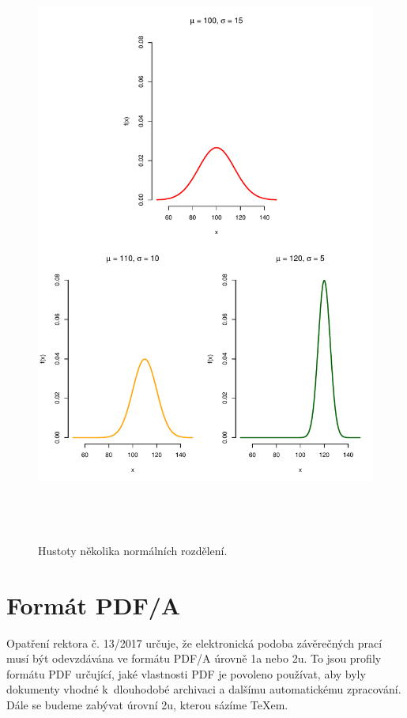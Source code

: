 \begin{figure}[p]\centering
\includegraphics[width=140mm, height=198mm]{../img/ukazka-obr03}
\caption{Hustoty několika normálních rozdělení.}
\label{obr03:Nhust:podruhe}

\end{figure}

\chapter{Formát PDF/A}

Opatření rektora č. 13/2017 určuje, že elektronická podoba závěrečných
prací musí být odevzdávána ve formátu PDF/A úrovně 1a nebo 2u. To jsou
profily formátu PDF určující, jaké vlastnosti PDF je povoleno používat,
aby byly dokumenty vhodné k~dlouhodobé archivaci a dalšímu automatickému
zpracování. Dále se budeme zabývat úrovní 2u, kterou sázíme \TeX{}em.

